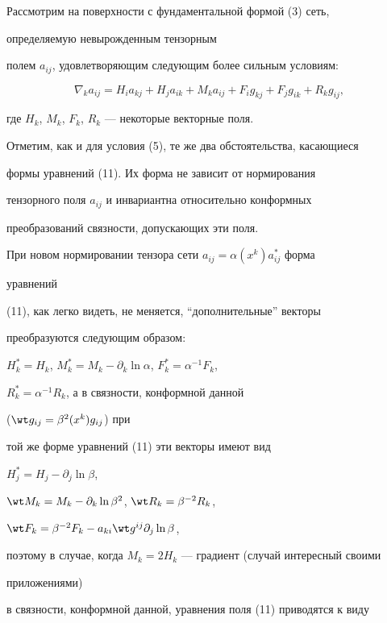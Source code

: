  


Рассмотрим на поверхности с фундаментальной формой (3) сеть,


определяемую невырожденным тензорным 


полем $a_{ij}$, удовлетворяющим следующим более сильным условиям:


\begin{equation} 


\nabla_k a_{ij}=H_i a_{kj}+H_j a_{ik}+ 


M_k a_{ij}+F_i g_{kj}+F_j g_{ik}+R_k g_{ij}, 


\end{equation} 


где $H_k$, $M_k$, $F_k$, $R_k$ --- некоторые векторные поля. 


 


Отметим, как и для условия (5), те же два обстоятельства, касающиеся  


формы уравнений (11). Их форма не зависит от нормирования  


тензорного поля $a_{ij}$ и инвариантна относительно конформных


преобразований связности, допускающих эти поля. 


 


При новом нормировании тензора сети $a_{ij}=\alpha(x^k)a^*_{ij}$ форма 


уравнений  


(11), как легко видеть, не меняется, ``дополнительные'' векторы 


преобразуются следующим образом:


$H^*_k=H_k$, $M^*_k=M_k-\partial_k\ln\alpha$, $F^*_k=\alpha^{-1}F_k$, 


$R^*_k=\alpha^{-1}R_k$, а в связности, конформной данной 


($\wt g_{ij}=\beta^2(x^k)g_{ij}$) при  


той же форме уравнений (11) эти векторы имеют вид


$H^*_j=H_j-\partial_j\ln\beta$, 


$\wt M_k=M_k-\partial_k\ln\beta^2$, $\wt R_k=\beta^{-2}R_k$, 


$\wt F_k=\beta^{-2}F_k-a_{ki}\wt g^{ij}\partial_j\ln\beta$, 


поэтому в случае, когда $M_k=2H_k$ --- градиент (случай интересный своими 


приложениями) 


в связности, конформной данной, уравнения поля (11) приводятся к виду 


